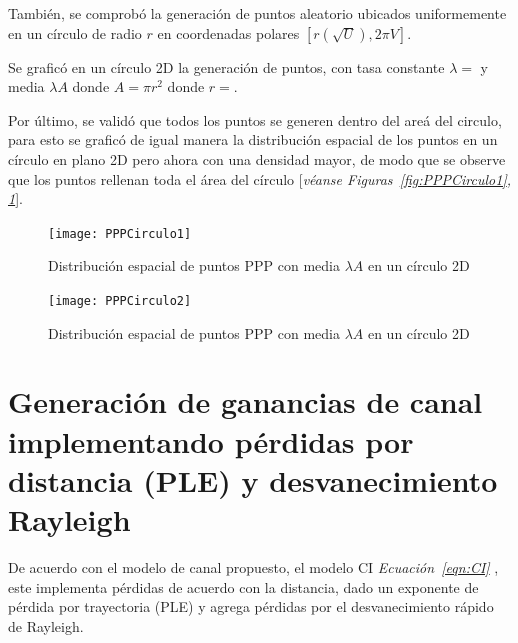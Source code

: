 También, se comprobó la generación de puntos aleatorio ubicados uniformemente en un círculo de radio $r$ en coordenadas polares $[r(\sqrt{U}), 2\pi V]$.\newline

Se graficó en un círculo 2D la generación de puntos, con tasa constante $\lambda = $ y media $\lambda A$ donde $A=\pi r^{2}$ donde $r = $.

Por último, se validó que todos los puntos se generen dentro del areá del circulo, para esto se graficó de igual manera la distribución espacial de los puntos en un círculo en plano 2D pero ahora con una densidad mayor, de modo que se observe que los puntos rellenan toda el área del círculo [\textit{véanse Figuras~\ref{fig:PPPCirculo1}, \ref{fig:PPPCirculo2}}].

\begin{figure}
    \centering
    \begin{minipage}{.45\linewidth}
      \texttt{[image: PPPCirculo1]}
      \caption[Distribución espacial de puntos PPP en un círculo 2D]{Distribución espacial de puntos PPP con media $\lambda A$ en un círculo 2D}
      \label{fig:PPPCirculo1}
    \end{minipage}
    \hspace{.05\linewidth}
    \begin{minipage}{.45\linewidth}
      \texttt{[image: PPPCirculo2]}
      \caption[Distribución espacial de puntos PPP en un círculo 2D]{Distribución espacial de puntos PPP con media $\lambda A$ en un círculo 2D}
      \label{fig:PPPCirculo2}
    \end{minipage}
\end{figure}



\section{Generación de ganancias de canal implementando pérdidas por distancia (PLE) y desvanecimiento Rayleigh}

De acuerdo con el modelo de canal propuesto, el modelo CI \textit{Ecuación~\ref{eqn:CI}} \parencite{Sun2016}, este implementa pérdidas de acuerdo con la distancia, dado un exponente de pérdida por trayectoria (PLE) y agrega pérdidas por el desvanecimiento rápido de Rayleigh.\newline

